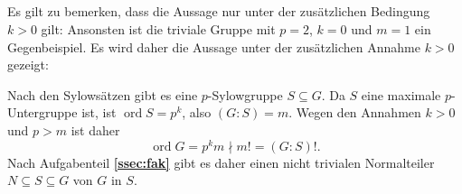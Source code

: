 \documentclass[a4paper,10pt]{article}
\theoremstyle{definition}
\newcommand{\ord}{\operatorname{ord}}
\begin{document}
\subsection{}
Es gilt zu bemerken, dass die Aussage nur unter der zusätzlichen Bedingung $k > 0$ gilt: Ansonsten ist die triviale Gruppe mit $p=2$, $k=0$ und $m=1$ ein Gegenbeispiel. Es wird daher die Aussage unter der zusätzlichen Annahme $k > 0$ gezeigt:

Nach den Sylowsätzen gibt es eine $p$-Sylowgruppe $S \subseteq G$. Da $S$ eine maximale $p$-Untergruppe ist, ist $\ord S = p^k$, also $(G : S) = m$. Wegen den Annahmen $k > 0$ und $p > m$ ist daher
\[
\ord G = p^k m \nmid m! = (G : S)!.
\]
Nach Aufgabenteil \textbf{\ref{ssec:fak}} gibt es daher einen nicht trivialen Normalteiler $N \subseteq S \subseteq G$ von $G$ in $S$.
\end{document}

